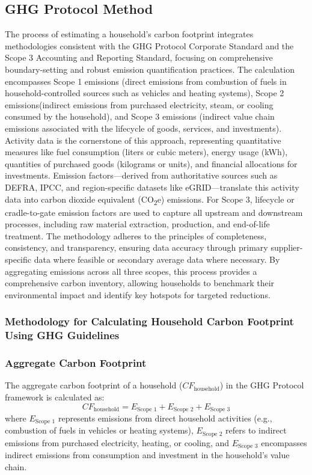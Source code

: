\documentclass[12pt,a4paper]{article}
\begin{document}
\subsection{GHG Protocol Method}
The process of estimating a household's carbon footprint integrates methodologies consistent with the GHG Protocol Corporate Standard and the Scope 3 Accounting and Reporting Standard, focusing on comprehensive boundary-setting and robust emission quantification practices. The calculation encompasses Scope 1 emissions (direct emissions from combustion of fuels in household-controlled sources such as vehicles and heating systems), Scope 2 emissions(indirect emissions from purchased electricity, steam, or cooling consumed by the household), and Scope 3 emissions (indirect value chain emissions associated with the lifecycle of goods, services, and investments). Activity data is the cornerstone of this approach, representing quantitative measures like fuel consumption (liters or cubic meters), energy usage (kWh), quantities of purchased goods (kilograms or units), and financial allocations for investments. Emission factors—derived from authoritative sources such as DEFRA, IPCC, and region-specific datasets like eGRID—translate this activity data into carbon dioxide equivalent (CO\textsubscript{2}e) emissions. For Scope 3, lifecycle or cradle-to-gate emission factors are used to capture all upstream and downstream processes, including raw material extraction, production, and end-of-life treatment. The methodology adheres to the principles of completeness, consistency, and transparency, ensuring data accuracy through primary supplier-specific data where feasible or secondary average data where necessary. By aggregating emissions across all three scopes, this process provides a comprehensive carbon inventory, allowing households to benchmark their environmental impact and identify key hotspots for targeted reductions.

\subsubsection{Methodology for Calculating Household Carbon Footprint Using GHG Guidelines}

\subsubsection*{Aggregate Carbon Footprint}

The aggregate carbon footprint of a household (\(CF_{\text{household}}\)) in the GHG Protocol framework is calculated as:
\begin{equation}
CF_{\text{household}} = E_{\text{Scope 1}} + E_{\text{Scope 2}} + E_{\text{Scope 3}}
\end{equation}
where \(E_{\text{Scope 1}}\) represents emissions from direct household activities (e.g., combustion of fuels in vehicles or heating systems), \(E_{\text{Scope 2}}\) refers to indirect emissions from purchased electricity, heating, or cooling, and \(E_{\text{Scope 3}}\) encompasses indirect emissions from consumption and investment in the household's value chain.
\end{document}
